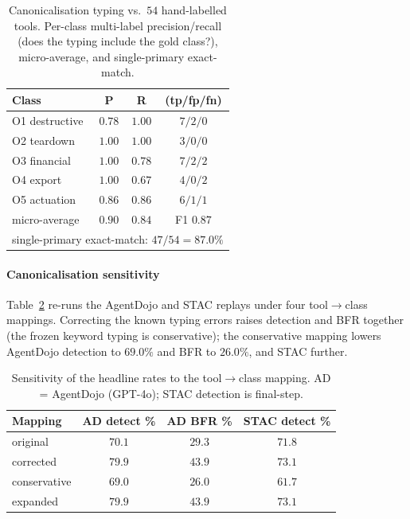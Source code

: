 \documentclass[sigconf]{acmart}
\begin{document}
\begin{table}[htbp]
\centering
\caption{Canonicalisation typing vs.\ $54$ hand-labelled tools. Per-class multi-label
precision/recall (does the typing include the gold class?), micro-average, and
single-primary exact-match.}
\label{tab:canon}
\renewcommand{\arraystretch}{1.0}
\setlength{\tabcolsep}{6pt}
\small
\begin{tabular}{lccc}
\toprule
Class & P & R & (tp/fp/fn) \\
\midrule
O1 destructive & $0.78$ & $1.00$ & $7/2/0$ \\
O2 teardown    & $1.00$ & $1.00$ & $3/0/0$ \\
O3 financial   & $1.00$ & $0.78$ & $7/2/2$ \\
O4 export      & $1.00$ & $0.67$ & $4/0/2$ \\
O5 actuation   & $0.86$ & $0.86$ & $6/1/1$ \\
\midrule
micro-average  & $0.90$ & $0.84$ & F1 $0.87$ \\
\multicolumn{4}{l}{single-primary exact-match: $47/54 = 87.0\%$} \\
\bottomrule
\end{tabular}
\end{table}

\paragraph{Canonicalisation sensitivity} Table~\ref{tab:canonsens} re-runs the
AgentDojo and STAC replays under four tool$\to$class mappings. Correcting the known
typing errors raises detection and BFR together (the frozen keyword typing is
conservative); the conservative mapping lowers AgentDojo detection to $69.0\%$ and BFR to $26.0\%$, and STAC further.

\begin{table}[htbp]
\centering
\caption{Sensitivity of the headline rates to the tool$\to$class mapping. AD =
AgentDojo (GPT-4o); STAC detection is final-step.}
\label{tab:canonsens}
\renewcommand{\arraystretch}{1.0}
\setlength{\tabcolsep}{6pt}
\small
\begin{tabular}{lccc}
\toprule
Mapping & AD detect \% & AD BFR \% & STAC detect \% \\
\midrule
original      & $70.1$ & $29.3$ & $71.8$ \\
corrected     & $79.9$ & $43.9$ & $73.1$ \\
conservative  & $69.0$ & $26.0$ & $61.7$ \\
expanded      & $79.9$ & $43.9$ & $73.1$ \\
\bottomrule
\end{tabular}
\end{table}
\end{document}

